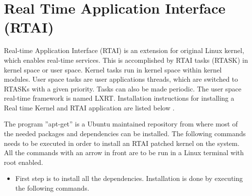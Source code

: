 \section{Real Time Application Interface (RTAI)}
\label{sec:RTAI}
Real-time Application Interface (RTAI) is an extension for original Linux kernel, which enables real-time services. This is accomplished by RTAI tasks (RTASK) in kernel space or user space. Kernel tasks run in kernel space within kernel modules. User space tasks are user applications threads, which are switched to RTASKs with a given priority. Tasks can also be made periodic. The user space real-time framework is named LXRT. Installation instructions for installing a Real time Kernel and RTAI application are listed below \cite{dhake2007real,antegazza2000rtai}.

The program ''apt-get'' is a Ubuntu maintained repository from where most of the needed packages and dependencies can be installed. The following commands needs to be executed in order to install an RTAI patched kernel on the system. All the commands with an arrow in front are to be run in a Linux terminal with root enabled.

\begin{itemize}
\item First step is to install all the dependencies. Installation is done by executing the following commands.
\end{itemize}

